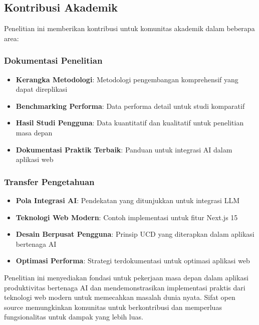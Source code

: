 \subsection{Kontribusi Akademik}

Penelitian ini memberikan kontribusi untuk komunitas akademik dalam beberapa area:

\subsubsection{Dokumentasi Penelitian}

\begin{itemize}
\item \textbf{Kerangka Metodologi}: Metodologi pengembangan komprehensif yang dapat direplikasi
\item \textbf{Benchmarking Performa}: Data performa detail untuk studi komparatif
\item \textbf{Hasil Studi Pengguna}: Data kuantitatif dan kualitatif untuk penelitian masa depan
\item \textbf{Dokumentasi Praktik Terbaik}: Panduan untuk integrasi AI dalam aplikasi web
\end{itemize}

\subsubsection{Transfer Pengetahuan}

\begin{itemize}
\item \textbf{Pola Integrasi AI}: Pendekatan yang ditunjukkan untuk integrasi LLM
\item \textbf{Teknologi Web Modern}: Contoh implementasi untuk fitur Next.js 15
\item \textbf{Desain Berpusat Pengguna}: Prinsip UCD yang diterapkan dalam aplikasi bertenaga AI
\item \textbf{Optimasi Performa}: Strategi terdokumentasi untuk optimasi aplikasi web
\end{itemize}

Penelitian ini menyediakan fondasi untuk pekerjaan masa depan dalam aplikasi produktivitas bertenaga AI dan mendemonstrasikan implementasi praktis dari teknologi web modern untuk memecahkan masalah dunia nyata. Sifat open source memungkinkan komunitas untuk berkontribusi dan memperluas fungsionalitas untuk dampak yang lebih luas.